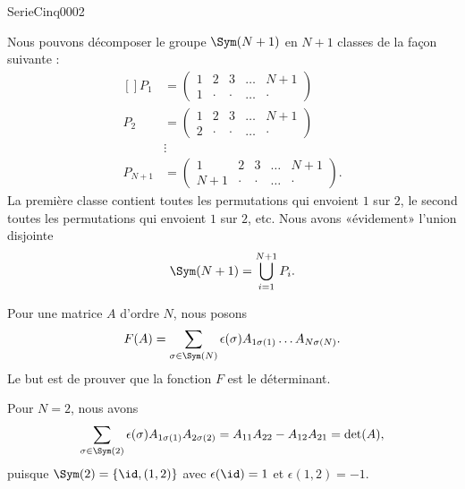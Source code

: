 
\begin{corrige}{SerieCinq0002}

Nous pouvons décomposer le groupe $\Sym(N+1)$ en $N+1$ classes de la façon suivante :
\begin{equation}
	\begin{aligned}[]
		P_1&=\begin{pmatrix}
			1	&	2	&	3	&	\ldots	&	N+1\\	
			1	&	\cdot	&	\cdot	&	\ldots	&	\cdot
		\end{pmatrix}\\
		P_2&=\begin{pmatrix}
			1	&	2	&	3	&	\ldots	&	N+1\\	
			2	&	\cdot	&	\cdot	&	\ldots	&	\cdot
		\end{pmatrix}\\
		&\vdots\\
		P_{N+1}&=\begin{pmatrix}
			1	&	2	&	3	&	\ldots	&	N+1\\	
			N+1	&	\cdot	&	\cdot	&	\ldots	&	\cdot
		\end{pmatrix}.
	\end{aligned}
\end{equation}
La première classe contient toutes les permutations qui envoient $1$ sur $2$, le second toutes les permutations qui envoient $1$ sur $2$, etc. Nous avons «évidement» l'union disjointe
\begin{equation}
	\Sym(N+1)=\bigcup_{i=1}^{N+1}P_i.
\end{equation}

Pour une matrice $A$ d'ordre $N$, nous posons 
\begin{equation}
	F(A)=\sum_{\sigma\in\Sym(N)}\epsilon(\sigma)A_{1\sigma(1)}\ldots A_{N\sigma(N)}.
\end{equation}
Le but est de prouver que la fonction $F$ est le déterminant.

Pour $N=2$, nous avons
\[
\sum_{\sigma \in \Sym(2)} \epsilon(\sigma) A_{1\sigma(1)} A_{2\sigma(2)} = A_{11} A_{22} - A_{12} A_{21}= \det(A),
\]
puisque $\Sym(2) = \{ \id, (1,2) \}$ avec $\epsilon(\id) = 1$ et $\epsilon(1,2) = -1$.


\end{corrige}
